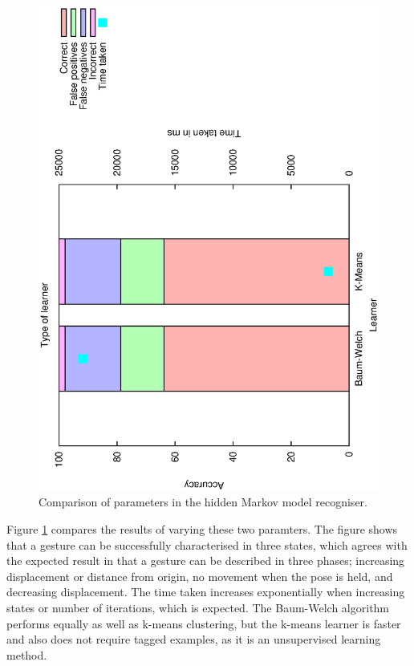 \documentclass[12pt,a4,notitlepage]{report}
\renewcommand{\_}{\texttt{\symbol{95}}}
\newcommand{\<}{\texttt{\symbol{60}}}
\renewcommand{\>}{\texttt{\symbol{62}}}
\begin{document}
\begin{figure}
\includegraphics[scale=0.4,angle=-90]{results/markov/m_learner.ps}
\caption{Comparison of parameters in the hidden Markov model recogniser.}
\label{m_parameters}
\end{figure}

Figure \ref{m_parameters} compares the results of varying these two paramters. The figure shows that a gesture can be successfully characterised in three states, which agrees with the expected result in that a gesture can be described in three phases; increasing displacement or distance from origin, no movement when the pose is held, and decreasing displacement. The time taken increases exponentially when increasing states or number of iterations, which is expected. The Baum-Welch algorithm performs equally as well as k-means clustering, but the k-means learner is faster and also does not require tagged examples, as it is an unsupervised learning method.
\end{document}
